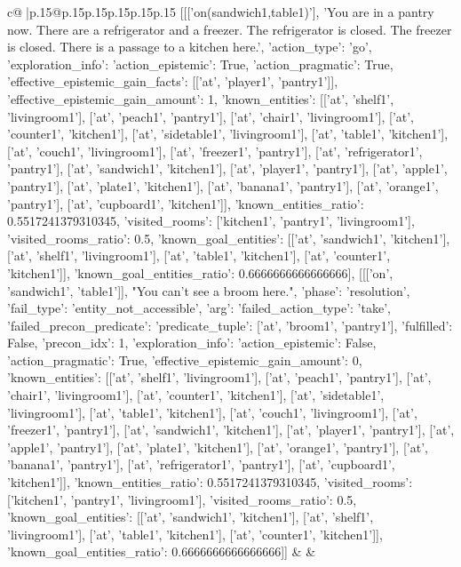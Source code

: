 \documentclass{article}
\begin{document}
{\begin{supertabular}{c@{$\;$}|p{.15\linewidth}@{}p{.15\linewidth}p{.15\linewidth}p{.15\linewidth}p{.15\linewidth}p{.15\linewidth}}
{{{	 [[['on(sandwich1,table1)'], 'You are in a pantry now. There are a refrigerator and a freezer. The refrigerator is closed. The freezer is closed. There is a passage to a kitchen here.', {'action_type': 'go', 'exploration_info': {'action_epistemic': True, 'action_pragmatic': True, 'effective_epistemic_gain_facts': [['at', 'player1', 'pantry1']], 'effective_epistemic_gain_amount': 1, 'known_entities': [['at', 'shelf1', 'livingroom1'], ['at', 'peach1', 'pantry1'], ['at', 'chair1', 'livingroom1'], ['at', 'counter1', 'kitchen1'], ['at', 'sidetable1', 'livingroom1'], ['at', 'table1', 'kitchen1'], ['at', 'couch1', 'livingroom1'], ['at', 'freezer1', 'pantry1'], ['at', 'refrigerator1', 'pantry1'], ['at', 'sandwich1', 'kitchen1'], ['at', 'player1', 'pantry1'], ['at', 'apple1', 'pantry1'], ['at', 'plate1', 'kitchen1'], ['at', 'banana1', 'pantry1'], ['at', 'orange1', 'pantry1'], ['at', 'cupboard1', 'kitchen1']], 'known_entities_ratio': 0.5517241379310345, 'visited_rooms': ['kitchen1', 'pantry1', 'livingroom1'], 'visited_rooms_ratio': 0.5, 'known_goal_entities': [['at', 'sandwich1', 'kitchen1'], ['at', 'shelf1', 'livingroom1'], ['at', 'table1', 'kitchen1'], ['at', 'counter1', 'kitchen1']], 'known_goal_entities_ratio': 0.6666666666666666}}], [[['on', 'sandwich1', 'table1']], "You can't see a broom here.", {'phase': 'resolution', 'fail_type': 'entity_not_accessible', 'arg': {'failed_action_type': 'take', 'failed_precon_predicate': {'predicate_tuple': ['at', 'broom1', 'pantry1'], 'fulfilled': False, 'precon_idx': 1}}, 'exploration_info': {'action_epistemic': False, 'action_pragmatic': True, 'effective_epistemic_gain_amount': 0, 'known_entities': [['at', 'shelf1', 'livingroom1'], ['at', 'peach1', 'pantry1'], ['at', 'chair1', 'livingroom1'], ['at', 'counter1', 'kitchen1'], ['at', 'sidetable1', 'livingroom1'], ['at', 'table1', 'kitchen1'], ['at', 'couch1', 'livingroom1'], ['at', 'freezer1', 'pantry1'], ['at', 'sandwich1', 'kitchen1'], ['at', 'player1', 'pantry1'], ['at', 'apple1', 'pantry1'], ['at', 'plate1', 'kitchen1'], ['at', 'orange1', 'pantry1'], ['at', 'banana1', 'pantry1'], ['at', 'refrigerator1', 'pantry1'], ['at', 'cupboard1', 'kitchen1']], 'known_entities_ratio': 0.5517241379310345, 'visited_rooms': ['kitchen1', 'pantry1', 'livingroom1'], 'visited_rooms_ratio': 0.5, 'known_goal_entities': [['at', 'sandwich1', 'kitchen1'], ['at', 'shelf1', 'livingroom1'], ['at', 'table1', 'kitchen1'], ['at', 'counter1', 'kitchen1']], 'known_goal_entities_ratio': 0.6666666666666666}}]] 
	  } 
	   } 
	   } 
	 & & \\ 
 


\end{supertabular}}
\end{document}
